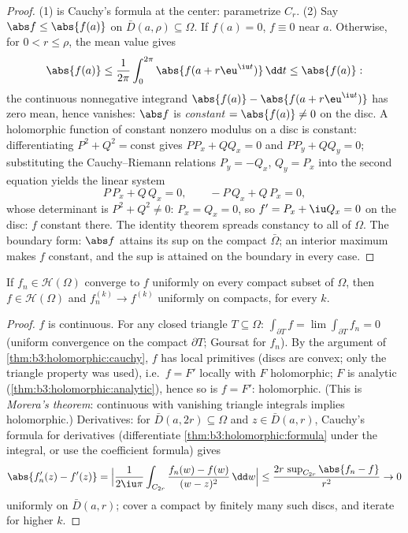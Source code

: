 \begin{proof}
(1) is Cauchy's formula at the center: parametrize $C_r$.
(2) Say $\abs f \leq \abs{f(a)}$ on $\bar D(a, \rho)
\subseteq \Omega$. If $f(a) = 0$, $f \equiv 0$ near $a$.
Otherwise, for $0 < r \leq \rho$, the mean value gives
\[
\abs{f(a)} \leq \frac1{2\pi}\int_0^{2\pi}\abs{f(a +
r\eu^{\iu t})}\,\dd t \leq \abs{f(a)} :
\]
the continuous nonnegative integrand $\abs{f(a)} - \abs{f(a +
r\eu^{\iu t})}$ has zero mean, hence vanishes: $\abs f$ is
\emph{constant} $= \abs{f(a)} \ne 0$ on the disc. A holomorphic
function of constant nonzero modulus on a disc is constant:
differentiating $P^2 + Q^2 = \text{const}$ gives $PP_x + QQ_x
= 0$ and $PP_y + QQ_y = 0$; substituting the Cauchy--Riemann
relations $P_y = -Q_x$, $Q_y = P_x$ into the second equation
yields the linear system
\[
P\,P_x + Q\,Q_x = 0, \qquad -P\,Q_x + Q\,P_x = 0,
\]
whose determinant is $P^2 + Q^2 \neq 0$: $P_x = Q_x = 0$, so
$f' = P_x + \iu Q_x = 0$ on the disc: $f$ constant there. The
identity theorem spreads constancy to all of $\Omega$. The boundary form: $\abs f$
attains its sup on the compact $\bar\Omega$; an interior
maximum makes $f$ constant, and the sup is attained on the
boundary in every case.
\end{proof}

\begin{theorem}
\label{thm:b3:holomorphic:weierstrassconv}
If $f_n \in \mathcal H(\Omega)$ converge to $f$ uniformly on
every compact subset of $\Omega$, then $f \in \mathcal
H(\Omega)$ and $f_n^{(k)} \to f^{(k)}$ uniformly on compacts,
for every $k$.
\end{theorem}

\begin{proof}
$f$ is continuous. For any closed triangle $T \subseteq
\Omega$: $\int_{\partial T}f = \lim\int_{\partial T}f_n = 0$
(uniform convergence on the compact $\partial T$; Goursat for
$f_n$). By the argument of \cref{thm:b3:holomorphic:cauchy},
$f$ has local primitives (discs are convex; only the triangle
property was used), i.e.\ $f = F'$ locally with $F$
holomorphic; $F$ is analytic
(\cref{thm:b3:holomorphic:analytic}), hence so is $f = F'$:
holomorphic. (This is \emph{Morera's
theorem}: continuous with vanishing
triangle integrals implies holomorphic.) Derivatives: for
$\bar D(a, 2r) \subseteq \Omega$ and $z \in \bar D(a, r)$,
Cauchy's formula for derivatives (differentiate
\cref{thm:b3:holomorphic:formula} under the integral, or use
the coefficient formula) gives
\[
\abs{f_n'(z) - f'(z)} =
\Bigl|\frac{1}{2\iu\pi}\int_{C_{2r}}\frac{f_n(w) - f(w)}{(w -
z)^2}\,\dd w\Bigr|
\leq \frac{2r\,\sup_{C_{2r}}\abs{f_n - f}}{r^2} \to 0
\]
uniformly on $\bar D(a,r)$; cover a compact by finitely many
such discs, and iterate for higher $k$.
\end{proof}

